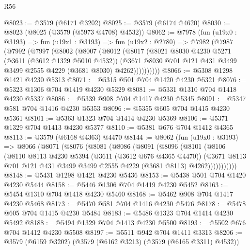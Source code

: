 \begin{lexlean}{R56}
\begin{coremodule}
@8023 := @3579 (@6171 @3202)
@8025 := @3579 (@6174 @4620)
@8030 := @8023 (@8025 (@3579 (@5973 @4708) @4532))
@8062 := @7978
    (fun (u19x0 : @3193) =>
    fun (u19x1 : @3193) =>
    fun (u19x2 : @2780) =>
    @7982
      (@7987
        (@7992
          (@7997
            (@8002
              (@8007
                (@8012
                  (@8017
                    (@8021
                      @8030
                      @4230
                      @5271
                      (@3611 (@3612 @1329 @5010 @4532))
                      (@3671
                        @8030
                        @701
                        @121
                        @431
                        @3499
                        @3499
                        @2555
                        @4229
                        (@3681 @8030)
                        @4262))))))))))
@8066 := @5308 @1298 @1421 @4230 @5313
@8071 := @5315 @501 @704 @1420 @4230 @5321
@8076 := @5323 @1306 @704 @1419 @4230 @5329
@8081 := @5331 @1310 @704 @1418 @4230 @5337
@8086 := @5339 @908 @704 @1417 @4230 @5345
@8091 := @5347 @581 @704 @1416 @4230 @5353
@8096 := @5355 @605 @704 @1415 @4230 @5361
@8101 := @5363 @1323 @704 @1414 @4230 @5369
@8106 := @5371 @1329 @704 @1413 @4230 @5377
@8110 := @5381 @676 @704 @1412 @4365
@8113 := @3579 (@6168 @4363) @4470
@8144 := @8062
    (fun (u19x0 : @3193) =>
    @8066
      (@8071
        (@8076
          (@8081
            (@8086
              (@8091
                (@8096
                  (@8101
                    (@8106
                      (@8110
                        @8113
                        @4230
                        @5394
                        (@3611 (@3612 @676 @4365 @4470))
                        (@3671
                          @8113
                          @701
                          @121
                          @431
                          @3499
                          @3499
                          @2555
                          @4229
                          (@3681 @8113)
                          @4262)))))))))))
@8148 := @5431 @1298 @1421 @4230 @5436
@8153 := @5438 @501 @704 @1420 @4230 @5444
@8158 := @5446 @1306 @704 @1419 @4230 @5452
@8163 := @5454 @1310 @704 @1418 @4230 @5460
@8168 := @5462 @908 @704 @1417 @4230 @5468
@8173 := @5470 @581 @704 @1416 @4230 @5476
@8178 := @5478 @605 @704 @1415 @4230 @5484
@8183 := @5486 @1323 @704 @1414 @4230 @5492
@8188 := @5494 @1329 @704 @1413 @4230 @5500
@8193 := @5502 @676 @704 @1412 @4230 @5508
@8197 := @5511 @942 @704 @1411 @3313
@8206 := @3579 (@6159 @3202) (@3579 (@6162 @3213) (@3579 (@6165 @3311) @4532))

\end{coremodule}
\end{lexlean}

